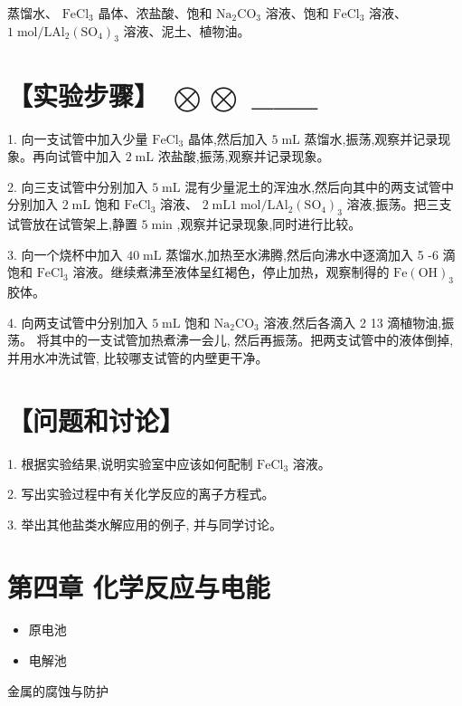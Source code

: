 \documentclass[10pt]{article}
\begin{document}
蒸馏水、 \({\mathrm{{FeCl}}}_{3}\) 晶体、浓盐酸、饱和 \({\mathrm{{Na}}}_{2}{\mathrm{{CO}}}_{3}\) 溶液、饱和 \({\mathrm{{FeCl}}}_{3}\) 溶液、 \(1\mathrm{\;{mol}}/\mathrm{L}{\mathrm{{Al}}}_{2}{\left( {\mathrm{{SO}}}_{4}\right) }_{3}\) 溶液、泥土、植物油。

\section*{【实验步骤】 \(\bigotimes \bigotimes\) \_\_\_}

1. 向一支试管中加入少量 \({\mathrm{{FeCl}}}_{3}\) 晶体,然后加入 \(5\mathrm{\;{mL}}\) 蒸馏水,振荡,观察并记录现象。再向试管中加入 \(2\mathrm{\;{mL}}\) 浓盐酸,振荡,观察并记录现象。

2. 向三支试管中分别加入 \(5\mathrm{\;{mL}}\) 混有少量泥土的浑浊水,然后向其中的两支试管中分别加入 \(2\mathrm{\;{mL}}\) 饱和 \({\mathrm{{FeCl}}}_{3}\) 溶液、 \(2\mathrm{\;{mL}}1\mathrm{\;{mol}}/\mathrm{L}{\mathrm{{Al}}}_{2}{\left( {\mathrm{{SO}}}_{4}\right) }_{3}\) 溶液,振荡。把三支试管放在试管架上,静置 \(5\mathrm{\;{min}}\) ,观察并记录现象,同时进行比较。

3. 向一个烧杯中加入 \({40}\mathrm{\;{mL}}\) 蒸馏水,加热至水沸腾,然后向沸水中逐滴加入 5 -6 滴饱和 \({\mathrm{{FeCl}}}_{3}\) 溶液。继续煮沸至液体呈红褐色，停止加热，观察制得的 \(\mathrm{{Fe}}{\left( \mathrm{{OH}}\right) }_{3}\) 胶体。

4. 向两支试管中分别加入 \(5\mathrm{\;{mL}}\) 饱和 \({\mathrm{{Na}}}_{2}{\mathrm{{CO}}}_{3}\) 溶液,然后各滴入 2 13 滴植物油,振荡。 将其中的一支试管加热煮沸一会儿, 然后再振荡。把两支试管中的液体倒掉, 并用水冲洗试管, 比较哪支试管的内壁更干净。

\section*{【问题和讨论】}

1. 根据实验结果,说明实验室中应该如何配制 \({\mathrm{{FeCl}}}_{3}\) 溶液。

2. 写出实验过程中有关化学反应的离子方程式。

3. 举出其他盐类水解应用的例子, 并与同学讨论。

\section*{第四章 化学反应与电能}

\begin{mdframed}

\begin{itemize}
\item 原电池
\end{itemize}

\begin{itemize}
\item 电解池
\end{itemize}

金属的腐蚀与防护

\end{mdframed}
\end{document}
